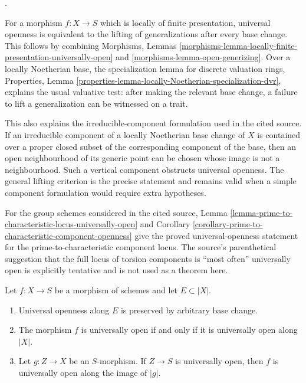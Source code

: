 \begin{remark}
\label{remark-universal-openness-valuative-components}
\begin{reference}
\cite[Expos\'e 236, Remark 1.6, p. 228]{FGA}.
\end{reference}
For a morphism $f : X \to S$ which is locally of finite presentation,
universal openness is equivalent to the lifting of generalizations after
every base change. This follows by combining Morphisms, Lemmas
\ref{morphisms-lemma-locally-finite-presentation-universally-open} and
\ref{morphisms-lemma-open-generizing}. Over a locally Noetherian base, the
specialization lemma for discrete valuation rings, Properties, Lemma
\ref{properties-lemma-locally-Noetherian-specialization-dvr}, explains the
usual valuative test: after making the relevant base change, a failure to
lift a generalization can be witnessed on a trait.

This also explains the irreducible-component formulation used in the cited
source. If an irreducible component of a locally Noetherian base change of
$X$ is contained over a proper closed subset of the corresponding component
of the base, then an open neighbourhood of its generic point can be chosen
whose image is not a neighbourhood. Such a vertical component obstructs
universal openness. The general lifting criterion is the precise statement
and remains valid when a simple component formulation would require extra
hypotheses.

For the group schemes considered in the cited source, Lemma
\ref{lemma-prime-to-characteristic-locus-universally-open} and Corollary
\ref{corollary-prime-to-characteristic-component-openness} give the proved
universal-openness statement for the prime-to-characteristic component
locus. The source's parenthetical suggestion that the full locus of torsion
components is ``most often'' universally open is explicitly tentative and is
not used as a theorem here.
\end{remark}

\begin{lemma}
\label{lemma-universally-open-along}
Let $f : X \to S$ be a morphism of schemes and let $E \subset |X|$.
\begin{enumerate}
\item Universal openness along $E$ is preserved by arbitrary base change.
\item The morphism $f$ is universally open if and only if it is universally
open along $|X|$.
\item Let $g : Z \to X$ be an $S$-morphism. If $Z \to S$ is universally
open, then $f$ is universally open along the image of $|g|$.
\end{enumerate}
\end{lemma}

